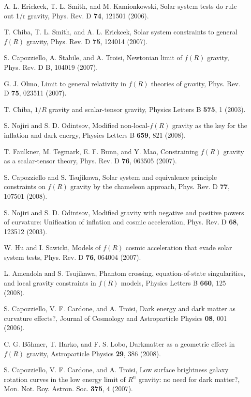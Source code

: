 \begin{thebibliography}{87}
 A. L. Erickcek, T. L. Smith, and M. Kamionkowski, Solar system tests do rule out 1/r gravity, Phys. Rev. D \textbf{74}, 121501 (2006).

 T. Chiba, T. L. Smith, and A. L. Erickcek, Solar system constraints to general $f(R)$ gravity, Phys. Rev. D \textbf{75}, 124014 (2007).

 S. Capozziello, A. Stabile, and A. Troisi, Newtonian limit of $f(R)$ gravity, Phys. Rev. D B, 104019 (2007).

 G. J. Olmo, Limit to general relativity in $f(R)$ theories of gravity, Phys. Rev. D \textbf{75}, 023511 (2007).

 T. Chiba, $1/R$ gravity and scalar-tensor gravity, Physics Letters B \textbf{575}, 1 (2003).

 S. Nojiri and S. D. Odintsov, Modified non-local-$f(R)$ gravity as the key for the inflation and dark energy, Physics Letters B
\textbf{659}, 821 (2008).

T. Faulkner, M. Tegmark, E. F. Bunn, and Y. Mao, Constraining $f(R)$ gravity as a scalar-tensor theory, Phys. Rev. D \textbf{76}, 063505
(2007).

S. Capozziello and S. Tsujikawa, Solar system and equivalence principle constraints on $f(R)$ gravity by the chameleon approach,
Phys. Rev. D \textbf{77}, 107501 (2008).

 S. Nojiri and S. D. Odintsov, Modified gravity with negative and positive powers of curvature: Unification of inflation and
cosmic acceleration, Phys. Rev. D \textbf{68}, 123512 (2003).

 W. Hu and I. Sawicki, Models of $f(R)$ cosmic acceleration that evade solar system tests, Phys. Rev. D \textbf{76}, 064004 (2007).

 L. Amendola and S. Tsujikawa, Phantom crossing, equation-of-state singularities, and local gravity constraints in $f(R)$ models,
Physics Letters B \textbf{660}, 125 (2008).

S. Capozziello, V. F. Cardone, and A. Troisi, Dark energy and dark matter as curvature effects?, Journal of Cosmology and
Astroparticle Physics \textbf{08}, 001 (2006).

C. G. B\"ohmer, T. Harko, and F. S. Lobo, Darkmatter as a geometric effect in $f(R)$ gravity, Astroparticle Physics \textbf{29}, 386 (2008).

 S. Capozziello, V. F. Cardone, and A. Troisi, Low surface brightness galaxy rotation curves in the low energy limit of $R^n$
gravity: no need for dark matter?, Mon. Not. Roy. Astron. Soc. \textbf{375}, 4 (2007).


\end{thebibliography}
